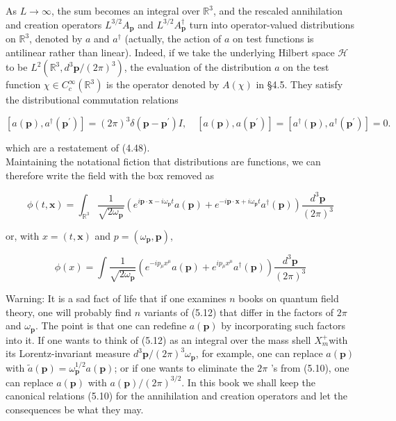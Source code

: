 \documentclass[10pt, letterpaper]{article}
\begin{document}
As $L \rightarrow \infty$, the sum becomes an integral over $\mathbb{R}^{3}$, and the rescaled annihilation and creation operators $L^{3 / 2} A_{\mathbf{p}}$ and $L^{3 / 2} A_{\mathbf{p}}^{\dagger}$ turn into operator-valued distributions on $\mathbb{R}^{3}$, denoted by $a$ and $a^{\dagger}$ (actually, the action of $a$ on test functions is antilinear rather than linear). Indeed, if we take the underlying Hilbert space $\mathcal{H}$ to be $L^{2}\left(\mathbb{R}^{3}, d^{3} \mathbf{p} /(2 \pi)^{3}\right)$, the evaluation of the distribution $a$ on the test function $\chi \in C_{c}^{\infty}\left(\mathbb{R}^{3}\right)$ is the operator denoted by $A(\chi)$ in §4.5. They satisfy the distributional commutation relations

$$
\left[a(\mathbf{p}), a^{\dagger}\left(\mathbf{p}^{\prime}\right)\right]=(2 \pi)^{3} \delta\left(\mathbf{p}-\mathbf{p}^{\prime}\right) I, \quad\left[a(\mathbf{p}), a\left(\mathbf{p}^{\prime}\right)\right]=\left[a^{\dagger}(\mathbf{p}), a^{\dagger}\left(\mathbf{p}^{\prime}\right)\right]=0 .
$$

which are a restatement of (4.48).\\
Maintaining the notational fiction that distributions are functions, we can therefore write the field with the box removed as

$$
\phi(t, \mathbf{x})=\int_{\mathbb{R}^{3}} \frac{1}{\sqrt{2 \omega_{\mathbf{p}}}}\left(e^{i \mathbf{p} \cdot \mathbf{x}-i \omega_{\mathbf{p}} t} a(\mathbf{p})+e^{-i \mathbf{p} \cdot \mathbf{x}+i \omega_{\mathbf{p}} t} a^{\dagger}(\mathbf{p})\right) \frac{d^{3} \mathbf{p}}{(2 \pi)^{3}}
$$

or, with $x=(t, \mathbf{x})$ and $p=\left(\omega_{\mathbf{p}}, \mathbf{p}\right)$,

$$
\phi(x)=\int \frac{1}{\sqrt{2 \omega_{\mathbf{p}}}}\left(e^{-i p_{\mu} x^{\mu}} a(\mathbf{p})+e^{i p_{\mu} x^{\mu}} a^{\dagger}(\mathbf{p})\right) \frac{d^{3} \mathbf{p}}{(2 \pi)^{3}}
$$

Warning: It is a sad fact of life that if one examines $n$ books on quantum field theory, one will probably find $n$ variants of (5.12) that differ in the factors of $2 \pi$ and $\omega_{\mathbf{p}}$. The point is that one can redefine $a(\mathbf{p})$ by incorporating such factors into it. If one wants to think of (5.12) as an integral over the mass shell $X_{m}^{+}$with its Lorentz-invariant measure $d^{3} \mathbf{p} /(2 \pi)^{3} \omega_{\mathbf{p}}$, for example, one can replace $a(\mathbf{p})$ with $\widetilde{a}(\mathbf{p})=\omega_{\mathbf{p}}^{1 / 2} a(\mathbf{p})$; or if one wants to eliminate the $2 \pi$ 's from (5.10), one can replace $a(\mathbf{p})$ with $a(\mathbf{p}) /(2 \pi)^{3 / 2}$. In this book we shall keep the canonical relations (5.10) for the annihilation and creation operators and let the consequences be what they may.
\end{document}
